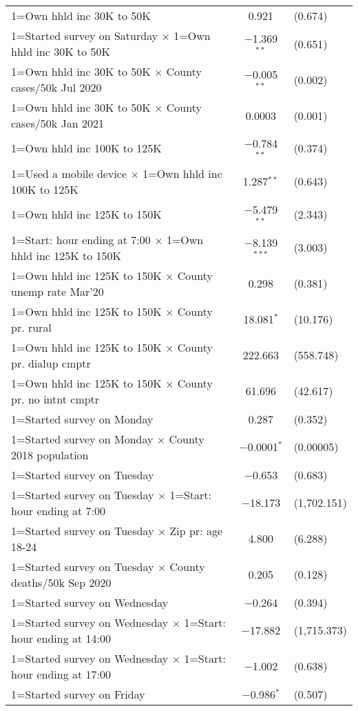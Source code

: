 \begin{table}[!htbp]
\begin{tabular}{@{\extracolsep{5pt}}lc}
  1=Own hhld inc 30K to 50K & 0.921 & (0.674) \\ 
  1=Started survey on Saturday $\times$ 1=Own hhld inc 30K to 50K & $-$1.369$^{**}$ & (0.651) \\ 
  1=Own hhld inc 30K to 50K $\times$ County cases/50k Jul 2020 & $-$0.005$^{**}$ & (0.002) \\ 
  1=Own hhld inc 30K to 50K $\times$ County cases/50k Jan 2021 & 0.0003 & (0.001) \\ 
  1=Own hhld inc 100K to 125K & $-$0.784$^{**}$ & (0.374) \\ 
  1=Used a mobile device $\times$ 1=Own hhld inc 100K to 125K & 1.287$^{**}$ & (0.643) \\ 
  1=Own hhld inc 125K to 150K & $-$5.479$^{**}$ & (2.343) \\ 
  1=Start: hour ending at 7:00 $\times$ 1=Own hhld inc 125K to 150K & $-$8.139$^{***}$ & (3.003) \\ 
  1=Own hhld inc 125K to 150K $\times$ County unemp rate Mar'20 & 0.298 & (0.381) \\ 
  1=Own hhld inc 125K to 150K $\times$ County pr. rural & 18.081$^{*}$ & (10.176) \\ 
  1=Own hhld inc 125K to 150K $\times$ County pr. dialup cmptr & 222.663 & (558.748) \\ 
  1=Own hhld inc 125K to 150K $\times$ County pr. no intnt cmptr & 61.696 & (42.617) \\ 
  1=Started survey on Monday & 0.287 & (0.352) \\ 
  1=Started survey on Monday $\times$ County 2018 population & $-$0.0001$^{*}$ & (0.00005) \\ 
  1=Started survey on Tuesday & $-$0.653 & (0.683) \\ 
  1=Started survey on Tuesday $\times$ 1=Start: hour ending at 7:00 & $-$18.173 & (1,702.151) \\ 
  1=Started survey on Tuesday $\times$ Zip pr: age 18-24 & 4.800 & (6.288) \\ 
  1=Started survey on Tuesday $\times$ County deaths/50k Sep 2020 & 0.205 & (0.128) \\ 
  1=Started survey on Wednesday & $-$0.264 & (0.394) \\ 
  1=Started survey on Wednesday $\times$ 1=Start: hour ending at 14:00 & $-$17.882 & (1,715.373) \\ 
  1=Started survey on Wednesday $\times$ 1=Start: hour ending at 17:00 & $-$1.002 & (0.638) \\ 
  1=Started survey on Friday & $-$0.986$^{*}$ & (0.507) \\ 

\end{tabular}
\end{table}
